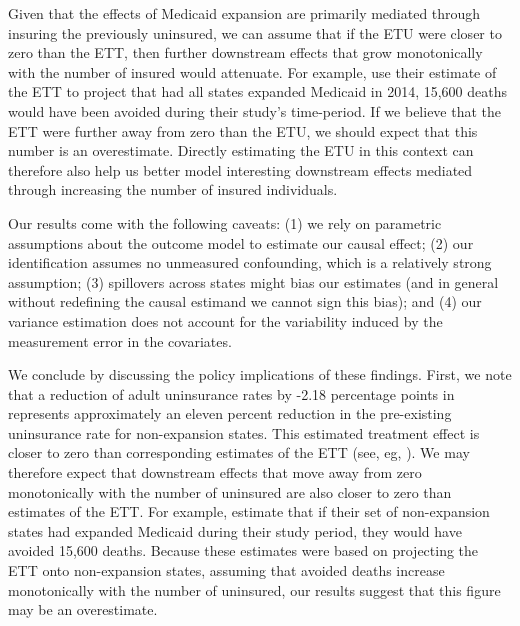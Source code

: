 \documentclass[12pt]{article}
\begin{document}
Given that the effects of Medicaid expansion are primarily mediated through insuring the previously uninsured, we can assume that if the ETU were closer to zero than the ETT, then further downstream effects that grow monotonically with the number of insured would attenuate. For example, \cite{miller2019medicaid} use their estimate of the ETT to project that had all states expanded Medicaid in 2014, 15,600 deaths would have been avoided during their study's time-period. If we believe that the ETT were further away from zero than the ETU, we should expect that this number is an overestimate. Directly estimating the ETU in this context can therefore also help us better model interesting downstream effects mediated through increasing the number of insured individuals.

Our results come with the following caveats: (1) we rely on parametric assumptions about the outcome model to estimate our causal effect; (2) our identification assumes no unmeasured confounding, which is a relatively strong assumption; (3) spillovers across states might bias our estimates (and in general without redefining the causal estimand we cannot sign this bias); and (4) our variance estimation does not account for the variability induced by the measurement error in the covariates. 

We conclude by discussing the policy implications of these findings. First, we note that a reduction of adult uninsurance rates by -2.18 percentage points in represents approximately an eleven percent reduction in the pre-existing uninsurance rate for non-expansion states. This estimated treatment effect is closer to zero than corresponding estimates of the ETT (see, eg, \cite{courtemanche2017early}). We may therefore expect that downstream effects that move away from zero monotonically with the number of uninsured are also closer to zero than estimates of the ETT. For example, \cite{miller2019medicaid} estimate that if their set of non-expansion states had expanded Medicaid during their study period, they would have avoided 15,600 deaths. Because these estimates were based on projecting the ETT onto non-expansion states, assuming that avoided deaths increase monotonically with the number of uninsured, our results suggest that this figure may be an overestimate.
\end{document}
